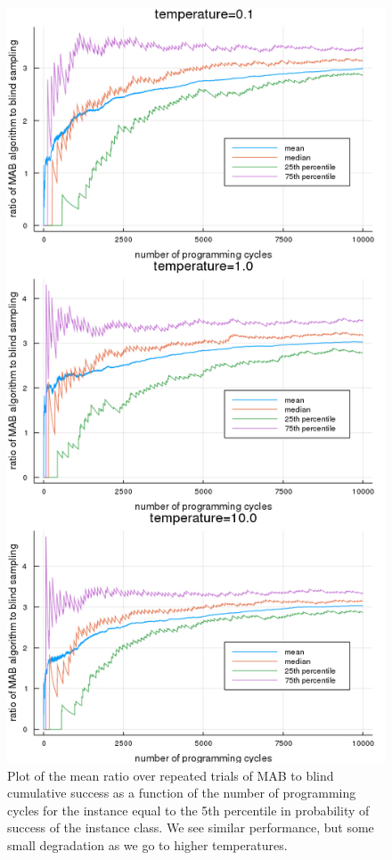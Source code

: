\begin{figure}
    \includegraphics[width=0.8\columnwidth]{boltzmann_inst1_air_eps_comp.png}
    \caption{Plot of the mean ratio over repeated trials of MAB to blind cumulative success as a function of the number of programming cycles for the instance equal to the 5th percentile in probability of success of the instance class. We see similar performance, but some small degradation as we go to higher temperatures.}
    \label{fig:boltzmann_inst1_air_eps_comp}
\end{figure}

